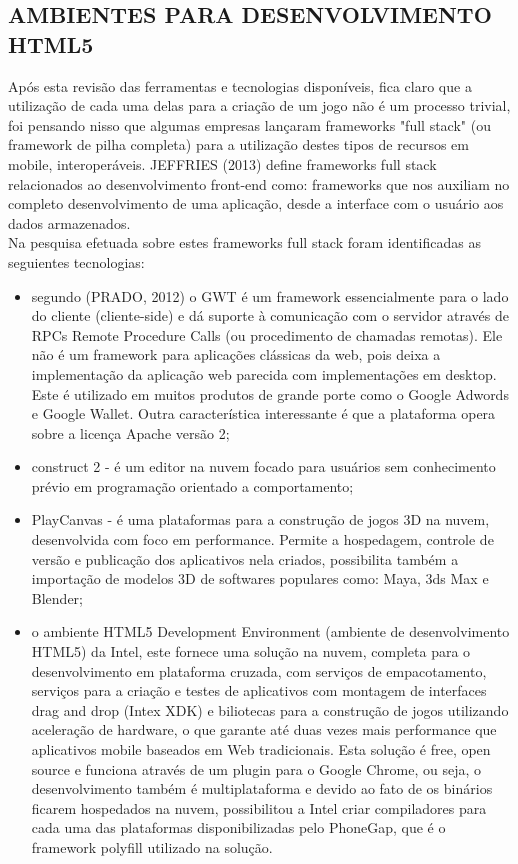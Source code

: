 \documentclass{article}
\begin{document}
\subsection{AMBIENTES PARA DESENVOLVIMENTO HTML5}

Após esta revisão das ferramentas  e tecnologias disponíveis, fica claro que a utilização de cada uma delas para a criação de um jogo não é um processo trivial, foi pensando nisso que algumas empresas lançaram frameworks "full stack"  (ou framework de pilha completa) para a utilização destes tipos de recursos em mobile, interoperáveis. JEFFRIES (2013) define frameworks full stack relacionados ao desenvolvimento front-end como: frameworks que nos auxiliam no completo desenvolvimento de uma aplicação, desde a interface com o usuário aos dados armazenados.
\\
Na pesquisa efetuada sobre estes frameworks full stack foram identificadas as seguientes tecnologias:

\begin{itemize}

    \item segundo (PRADO, 2012) o GWT é um framework essencialmente para o lado do cliente (cliente-side) e dá suporte à comunicação com o servidor através de RPCs Remote Procedure Calls (ou procedimento de chamadas remotas). Ele não é um framework para aplicações clássicas da web, pois deixa a implementação da aplicação web parecida com implementações em desktop. Este é utilizado em muitos produtos de grande porte como o Google Adwords e Google Wallet. Outra característica interessante é que a plataforma opera sobre a licença Apache versão 2;
    \item construct 2 -  é um editor na nuvem focado para usuários sem conhecimento prévio em programação orientado a comportamento;
    \item PlayCanvas - é uma plataformas para a construção de jogos 3D na nuvem, desenvolvida com foco em performance. Permite a hospedagem, controle de versão e publicação dos aplicativos nela criados, possibilita também a importação de modelos 3D de softwares populares como: Maya, 3ds Max e Blender;
    \item o ambiente HTML5 Development Environment (ambiente de desenvolvimento HTML5) da Intel, este fornece uma solução na nuvem, completa para o desenvolvimento em plataforma cruzada, com serviços de empacotamento, serviços para a criação e testes de aplicativos com montagem de interfaces drag and drop (Intex XDK) e biliotecas para a construção de jogos utilizando aceleração de hardware, o que garante até duas vezes mais performance que aplicativos mobile baseados em Web tradicionais. Esta solução é free, open source e funciona  através de um plugin para o Google Chrome, ou seja, o desenvolvimento também é multiplataforma e devido ao fato de os binários ficarem hospedados na nuvem, possibilitou a  Intel criar compiladores para cada uma das plataformas disponibilizadas pelo PhoneGap, que é o framework polyfill utilizado na solução.
\end{itemize}
\end{document}
